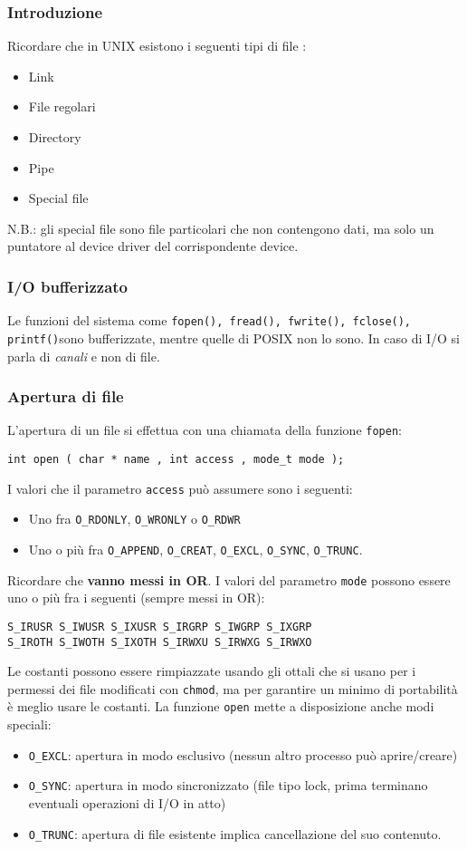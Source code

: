\documentclass[a4paper, 10pt]{article}
\begin{document}
\subsubsection{Introduzione}
Ricordare che in UNIX esistono i seguenti tipi di file :
\begin{itemize}
\item Link
\item File regolari
\item Directory
\item Pipe
\item Special file
\end{itemize}
N.B.: gli special file sono file particolari che non contengono dati, ma solo un puntatore al device driver del corrispondente device.

\subsubsection{I/O bufferizzato}
Le funzioni del sistema come 
\verb|fopen(), fread(), fwrite(), fclose(), printf()|sono bufferizzate, mentre quelle di POSIX non lo sono.
In caso di I/O si parla di \textit{canali} e non di file.
\subsubsection{Apertura di file}
L'apertura di un file si effettua con una chiamata della funzione \verb|fopen|:
\begin{verbatim}
int open ( char * name , int access , mode_t mode );
\end{verbatim}
I valori che il parametro \verb|access| può assumere sono i seguenti:
\begin{itemize}
\item Uno fra \verb|O_RDONLY|, \verb|O_WRONLY| o \verb|O_RDWR|
\item Uno o più fra \verb|O_APPEND|, \verb|O_CREAT|, \verb|O_EXCL|, \verb|O_SYNC|, \verb|O_TRUNC|.
\end{itemize}
Ricordare che \textbf{vanno messi in OR}.
I valori del parametro \verb|mode| possono essere uno o più fra i seguenti (sempre messi in OR):
\begin{verbatim}
S_IRUSR S_IWUSR S_IXUSR S_IRGRP S_IWGRP S_IXGRP
S_IROTH S_IWOTH S_IXOTH S_IRWXU S_IRWXG S_IRWXO
\end{verbatim}
Le costanti possono essere rimpiazzate usando gli ottali che si usano per i permessi dei file modificati con \verb|chmod|, ma per garantire un minimo di portabilità è meglio usare le costanti. La funzione \verb|open| mette a disposizione anche modi speciali:
\begin{itemize}
\item \verb|O_EXCL|: apertura in modo esclusivo (nessun altro processo può aprire/creare)
\item \verb|O_SYNC|: apertura in modo sincronizzato (file tipo lock, prima terminano eventuali operazioni di I/O in atto)
\item \verb|O_TRUNC|: apertura di file esistente implica cancellazione del suo contenuto.
\end{itemize}
\end{document}
